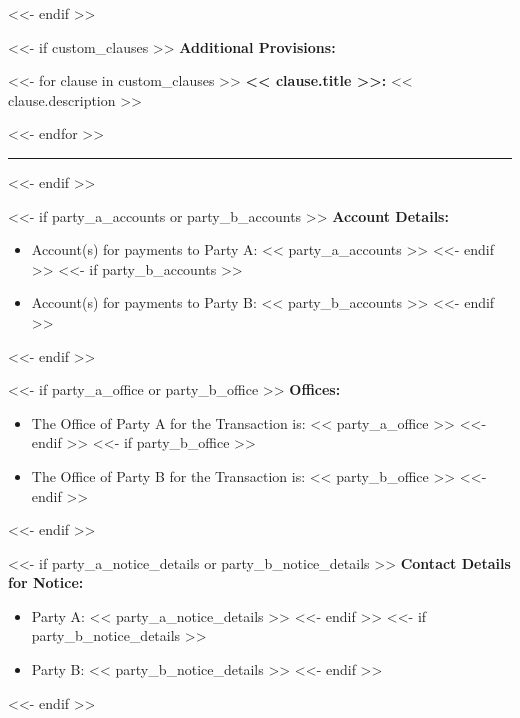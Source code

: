 \documentclass[11pt, a4paper]{article}
\begin{document}
<<- endif >>


<<- if custom_clauses >>
\noindent \textbf{Additional Provisions:}
\vspace{0.2cm}

<<- for clause in custom_clauses >>
\noindent \textbf{<< clause.title >>:} << clause.description >>

\vspace{0.2cm}
<<- endfor >>
\vspace{0.3cm}
\hrule
\vspace{0.5cm}
<<- endif >>


<<- if party_a_accounts or party_b_accounts >>
\noindent \textbf{Account Details:}
\begin{itemize}[leftmargin=2cm, label={}, itemsep=3pt]
<<- if party_a_accounts >>
    \item Account(s) for payments to Party A: << party_a_accounts >>
<<- endif >>
<<- if party_b_accounts >>
    \item Account(s) for payments to Party B: << party_b_accounts >>
<<- endif >>
\end{itemize}
\vspace{0.3cm}
<<- endif >>

<<- if party_a_office or party_b_office >>
\noindent \textbf{Offices:}
\begin{itemize}[leftmargin=2cm, label={}, itemsep=3pt]
<<- if party_a_office >>
    \item The Office of Party A for the Transaction is: << party_a_office >>
<<- endif >>
<<- if party_b_office >>
    \item The Office of Party B for the Transaction is: << party_b_office >>
<<- endif >>
\end{itemize}
\vspace{0.3cm}
<<- endif >>

<<- if party_a_notice_details or party_b_notice_details >>
\noindent \textbf{Contact Details for Notice:}
\begin{itemize}[leftmargin=2cm, label={}, itemsep=3pt]
<<- if party_a_notice_details >>
    \item Party A: << party_a_notice_details >>
<<- endif >>
<<- if party_b_notice_details >>
    \item Party B: << party_b_notice_details >>
<<- endif >>
\end{itemize}
\vspace{0.3cm}
<<- endif >>
\end{document}
